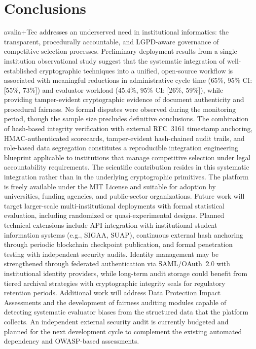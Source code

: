 \documentclass[preprint,12pt,a4paper]{elsarticle}
\begin{document}
\section{Conclusions}

avalia+Tec addresses an underserved need in institutional informatics: the transparent, procedurally accountable, and LGPD-aware governance of competitive selection processes. Preliminary deployment results from a single-institution observational study suggest that the systematic integration of well-established cryptographic techniques into a unified, open-source workflow is associated with meaningful reductions in administrative cycle time (65\%, 95\% CI: [55\%, 73\%]) and evaluator workload (45.4\%, 95\% CI: [26\%, 59\%]), while providing tamper-evident cryptographic evidence of document authenticity and procedural fairness. No formal disputes were observed during the monitoring period, though the sample size precludes definitive conclusions. The combination of hash-based integrity verification with external RFC~3161 timestamp anchoring, HMAC-authenticated scorecards, tamper-evident hash-chained audit trails, and role-based data segregation constitutes a reproducible integration engineering blueprint applicable to institutions that manage competitive selection under legal accountability requirements. The scientific contribution resides in this systematic integration rather than in the underlying cryptographic primitives. The platform is freely available under the MIT License and suitable for adoption by universities, funding agencies, and public-sector organizations. Future work will target larger-scale multi-institutional deployments with formal statistical evaluation, including randomized or quasi-experimental designs. Planned technical extensions include API integration with institutional student information systems (e.g., SIGAA, SUAP), continuous external hash anchoring through periodic blockchain checkpoint publication, and formal penetration testing with independent security audits. Identity management may be strengthened through federated authentication via SAML/OAuth~2.0 with institutional identity providers, while long-term audit storage could benefit from tiered archival strategies with cryptographic integrity seals for regulatory retention periods. Additional work will address Data Protection Impact Assessments and the development of fairness auditing modules capable of detecting systematic evaluator biases from the structured data that the platform collects. An independent external security audit is currently budgeted and planned for the next development cycle to complement the existing automated dependency and OWASP-based assessments.
\end{document}
